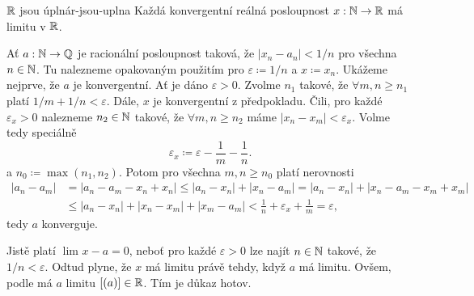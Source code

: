 \begin{corollary}{$\mathbb{R}$ jsou úplná}{r-jsou-uplna}
 Každá konvergentní reálná posloupnost $x:\mathbb{N} \to \mathbb{R}$ má limitu v $\mathbb{R}$.
\end{corollary}
\begin{corproof}
 Ať $a:\mathbb{N} \to \mathbb{Q}$ je racionální posloupnost taková, že $|x_n - a_n|<1/n$ pro
 všechna $n \in \mathbb{N}$. Tu nalezneme opakovaným použitím
  pro $\varepsilon \coloneqq 1 / n$ a $x
 \coloneqq x_n$. Ukážeme nejprve, že $a$ je konvergentní. Ať je dáno
 $\varepsilon>0$. Zvolme $n_1$ takové, že $ \forall m,n \geq n_1$ platí $1 / m +
 1 / n < \varepsilon$. Dále, $x$ je konvergentní z předpokladu. Čili, pro každé
 $\varepsilon_x>0$ nalezneme $n_2 \in \mathbb{N}$ takové, že $ \forall m,n \geq n_2$
 máme $|x_n - x_m|<\varepsilon_x$. Volme tedy speciálně
 \[
  \varepsilon_x \coloneqq \varepsilon - \frac{1}{m} - \frac{1}{n}.
 \]
 a $n_0 \coloneqq \max(n_1,n_2)$. Potom pro všechna $m,n \geq n_0$ platí
 nerovnosti
 \begin{align*}
  |a_n - a_m| &= |a_n - a_m - x_n + x_n| \leq |a_n - x_n| + |x_n - a_m| = |a_n -
  x_n| + |x_n - a_m - x_m + x_m| \\
              & \leq |a_n - x_n| + |x_n - x_m| + |x_m - a_m| < \frac{1}{n} +
              \varepsilon_x + \frac{1}{m} = \varepsilon,
 \end{align*}
 tedy $a$ konverguje.

 Jistě platí $\lim_{} x - a = 0$, neboť pro každé $\varepsilon>0$ lze najít
 $n \in \mathbb{N}$ takové, že $1 / n < \varepsilon$. Odtud plyne, že $x$ má limitu
 právě tehdy, když $a$ má limitu. Ovšem, podle
  má $a$ limitu $[(a)] \in
 \mathbb{R}$. Tím je důkaz hotov.
\end{corproof}

